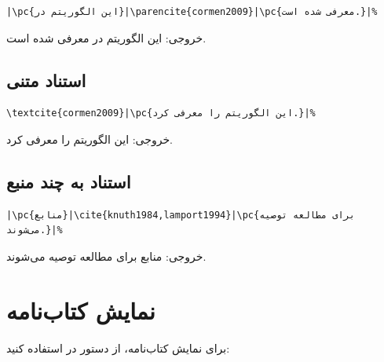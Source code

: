 \begin{latin}
\begin{verbatim}
|\pc{این الگوریتم در}|\parencite{cormen2009}|\pc{معرفی شده است.}|%
\end{verbatim}
\end{latin}

خروجی: این الگوریتم در \parencite{cormen2009}
معرفی شده است.


\subsection{استناد متنی}
\label{sec:bibliography-textcite}

\begin{latin}
\begin{verbatim}
\textcite{cormen2009}|\pc{این الگوریتم را معرفی کرد.}|%
\end{verbatim}
\end{latin}

خروجی: \textcite{cormen2009} این الگوریتم را
معرفی کرد.


\subsection{استناد به چند منبع}
\label{sec:bibliography-multiple}

\begin{latin}
\begin{verbatim}
|\pc{منابع}|\cite{knuth1984,lamport1994}|\pc{برای مطالعه توصیه می‌شوند.}|%
\end{verbatim}
\end{latin}

خروجی: منابع \cite{knuth1984,lamport1994} برای
مطالعه توصیه می‌شوند.


\section{نمایش کتاب‌نامه}
\label{sec:bibliography-print}

برای نمایش کتاب‌نامه، از دستور
 در 
استفاده کنید:

